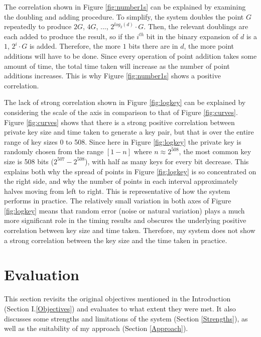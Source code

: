 \documentclass[12pt,a4paper]{article}
\begin{document}
The correlation shown in Figure \ref{fig:number1s} can be explained by examining the doubling and adding procedure. 
To simplify, the system doubles the point $G$ repeatedly to produce $2G$, $4G$, ..., $2^{log_2(d)} \cdot G$. 
Then, the relevant doublings are each added to produce the result, 
so if the $i^{th}$ bit in the binary expansion of $d$ is a $1$, $2^i \cdot G$ is added. 
Therefore, the more $1$ bits there are in $d$, the more point additions will have to be done. 
Since every operation of point addition takes some amount of time, the total time taken will increase as the number of point additions increases. 
This is why Figure \ref{fig:number1s} shows a positive correlation. 

\vspace{3mm}

The lack of strong correlation shown in Figure \ref{fig:logkey} can be explained by considering the scale of the axis in comparison to that of 
Figure \ref{fig:curves}. 
Figure \ref{fig:curves} shows that there is a strong positive correlation between private key size and time taken to generate a key pair, 
but that is over the entire range of key sizes 0 to 508. 
Since here in Figure \ref{fig:logkey} the private key is randomly chosen from the range $[1-n]$ where $n \approx 2^{508}$, 
the most common key size is 508 bits ($2^{507}-2^{508}$), with half as many keys for every bit decrease. 
This explains both why the spread of points in Figure \ref{fig:logkey} is so concentrated on the right side, 
and why the number of points in each interval approximately halves moving from left to right. 
This is representative of how the system performs in practice. 
The relatively small variation in both axes of Figure \ref{fig:logkey} means that random error (noise or natural variation) 
plays a much more significant role in the timing results and obscures the underlying positive correlation between key size and time taken. 
Therefore, my system does not show a strong correlation between the key size and the time taken in practice. 



\section{Evaluation} \noindent
This section revisits the original objectives mentioned in the Introduction (Section I.\ref{Objectives}) and evaluates to what extent they were met. 
It also discusses some strengths and limitations of the system (Section \ref{Strengths}), as well as the suitability of my approach (Section \ref{Approach}). 
\end{document}

